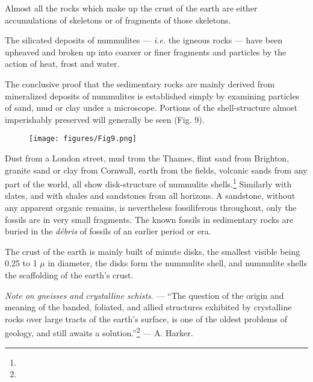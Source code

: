 \documentclass[a4paper, 12pt, oneside]{article}
\begin{document}
Almost all the rocks which make up the crust of the earth are either accumulations of skeletons or of fragments of those skeletons.

The silicated deposits of nummulites --- \emph{i.e.} the igneous rocks --- have been upheaved and broken up into coarser or finer fragments and particles by the action of heat, frost and water.

The conclusive proof that the sedimentary rocks are mainly derived from mineralized deposits of nummulites is established simply by examining particles of sand, mud or clay under a microscope. Portions of the shell-structure almost imperishably preserved will generally be seen (Fig. 9).
\begin{figure}[H]
\centering
\texttt{[image: figures/Fig9.png]}
\caption*{}
\end{figure}
Dust from a London street, mud trom the Thames, flint sand from Brighton, granite sand or clay from Cornwall, earth from the fields, volcanic sands from any part of the world, all show disk-structure of nummulite shells.\footnote{} Similarly with slates, and with shales and sandstones from all horizons. A sandstone, without any apparent organic remains, is nevertheless fossiliferous throughout, only the fossils are in very small fragments. The known fossils in sedimentary rocks are buried in the \emph{débris} of fossils of an earlier period or era.

The crust of the earth is mainly built of minute disks, the smallest visible being 0.25 to 1 $\mu$ in diameter, the disks form the nummulite shell, and nummulite shells the scaffolding of the earth's crust.

\emph{Note on gneisses and crystalline schists}. --- ``The question of the origin and meaning of the banded, foliated, and allied structures exhibited by crystalline rocks over large tracts of the earth's surface, is one of the oldest problems of geology, and still awaits a solution.''\footnote{} --- A. Harker.
\end{document}
